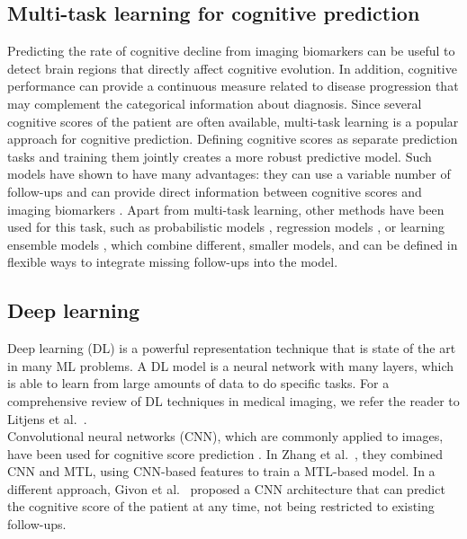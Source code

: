\subsection{Multi-task learning for cognitive prediction}

Predicting the rate of cognitive decline from imaging biomarkers can be useful to detect brain regions that directly affect cognitive evolution. In addition, cognitive performance can provide a continuous measure related to disease progression that may complement the categorical information about diagnosis. Since several cognitive scores of the patient are often available, multi-task learning is a popular approach for cognitive prediction. Defining cognitive scores as separate prediction tasks and training them jointly creates a more robust predictive model. Such models have shown to have many advantages: they can use a variable number of follow-ups \cite{Lei2017,Zhou2013a,Aksman2019} and can provide direct information between cognitive scores and imaging biomarkers \cite{Jie2017,Lei2017,Wang2012b,Wang2016,Zhang2012a}. Apart from multi-task learning, other methods have been used for this task, such as probabilistic models \cite{Zhu2018}, regression models \cite{AraqueCaballero2017}, or learning ensemble models \cite{Chi2017,Huang2016c,Yang2018a}, which combine different, smaller models, and can be defined in flexible ways to integrate missing follow-ups into the model. \\

\subsection{Deep learning}

Deep learning (DL) is a powerful representation technique that is state of the art in many ML problems. A DL model is a neural network with many layers, which is able to learn from large amounts of data to do specific tasks. For a comprehensive review of DL techniques in medical imaging, we refer the reader to Litjens et al.\ \cite{Litjens2017}. \\

Convolutional neural networks (CNN), which are commonly applied to images, have been used for cognitive score prediction \cite{Givon2017,Zhang2017}. In Zhang et al.\ \cite{Zhang2017}, they combined CNN and MTL, using CNN-based features to train a MTL-based model. In a different approach, Givon et al.\ \cite{Givon2017} proposed a CNN architecture that can predict the cognitive score of the patient at any time, not being restricted to existing follow-ups. \\

